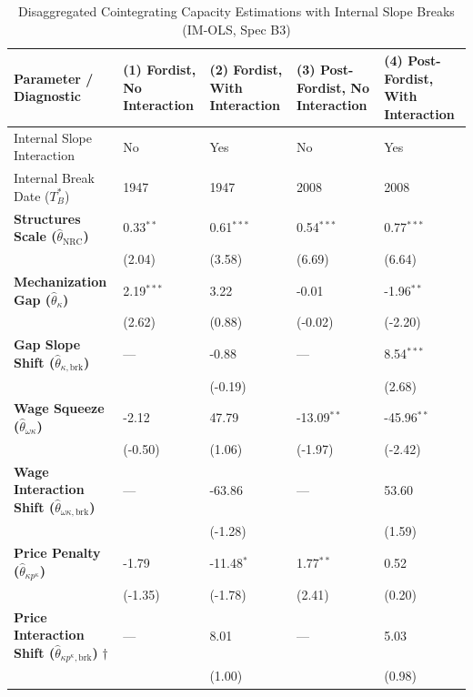 \documentclass[11pt,a4paper]{article}
\begin{document}
\begin{table}[H]
\centering
\caption{Disaggregated Cointegrating Capacity Estimations with Internal Slope Breaks (IM-OLS, Spec B3)}
\label{tab:specB_table_3_2}
\small
\begin{tabular}{p{5.5cm}p{2.5cm}p{2.5cm}p{2.5cm}p{2.5cm}}
\toprule
Parameter / Diagnostic & (1) Fordist, No Interaction & (2) Fordist, With Interaction & (3) Post-Fordist, No Interaction & (4) Post-Fordist, With Interaction \\
\midrule
Internal Slope Interaction & No & Yes & No & Yes \\
Internal Break Date ($T_B^*$) & 1947 & 1947 & 2008 & 2008 \\
\midrule
\textbf{Structures Scale ($\hat{\theta}_{\text{NRC}}$)} & 0.33$^{**}$ & 0.61$^{***}$ & 0.54$^{***}$ & 0.77$^{***}$ \\
 & {\scriptsize (2.04)} & {\scriptsize (3.58)} & {\scriptsize (6.69)} & {\scriptsize (6.64)} \\
\textbf{Mechanization Gap ($\hat{\theta}_{\kappa}$)} & 2.19$^{***}$ & 3.22 & -0.01 & -1.96$^{**}$ \\
 & {\scriptsize (2.62)} & {\scriptsize (0.88)} & {\scriptsize (-0.02)} & {\scriptsize (-2.20)} \\
\textbf{Gap Slope Shift ($\hat{\theta}_{\kappa, \text{brk}}$)} & --- & -0.88 & --- & 8.54$^{***}$ \\
 & & {\scriptsize (-0.19)} & & {\scriptsize (2.68)} \\
\textbf{Wage Squeeze ($\hat{\theta}_{\omega \kappa}$)} & -2.12 & 47.79 & -13.09$^{**}$ & -45.96$^{**}$ \\
 & {\scriptsize (-0.50)} & {\scriptsize (1.06)} & {\scriptsize (-1.97)} & {\scriptsize (-2.42)} \\
\textbf{Wage Interaction Shift ($\hat{\theta}_{\omega \kappa, \text{brk}}$)} & --- & -63.86 & --- & 53.60 \\
 & & {\scriptsize (-1.28)} & & {\scriptsize (1.59)} \\
\textbf{Price Penalty ($\hat{\theta}_{\kappa p^{\kappa}}$)} & -1.79 & -11.48$^{*}$ & 1.77$^{**}$ & 0.52 \\
 & {\scriptsize (-1.35)} & {\scriptsize (-1.78)} & {\scriptsize (2.41)} & {\scriptsize (0.20)} \\
\textbf{Price Interaction Shift ($\hat{\theta}_{\kappa p^{\kappa}, \text{brk}}$)} $\dagger$ & --- & 8.01 & --- & 5.03 \\
 & & {\scriptsize (1.00)} & & {\scriptsize (0.98)} \\

\end{tabular}
\end{table}
\end{document}
